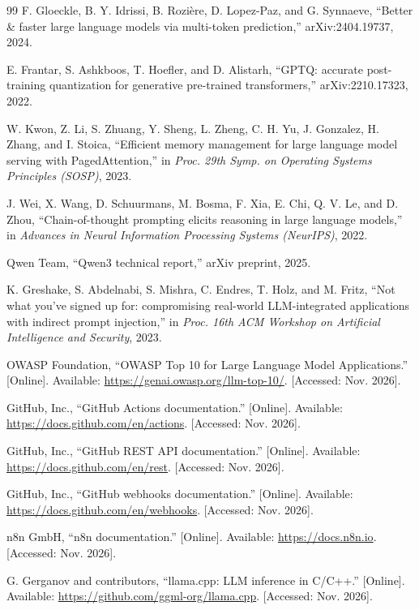 \begin{thebibliography}{99}
F. Gloeckle, B. Y. Idrissi, B. Rozi\`ere, D. Lopez-Paz, and G. Synnaeve, ``Better \& faster large language models via multi-token prediction,'' arXiv:2404.19737, 2024.

E. Frantar, S. Ashkboos, T. Hoefler, and D. Alistarh, ``GPTQ: accurate post-training quantization for generative pre-trained transformers,'' arXiv:2210.17323, 2022.

W. Kwon, Z. Li, S. Zhuang, Y. Sheng, L. Zheng, C. H. Yu, J. Gonzalez, H. Zhang, and I. Stoica, ``Efficient memory management for large language model serving with PagedAttention,'' in \textit{Proc. 29th Symp. on Operating Systems Principles (SOSP)}, 2023.

J. Wei, X. Wang, D. Schuurmans, M. Bosma, F. Xia, E. Chi, Q. V. Le, and D. Zhou, ``Chain-of-thought prompting elicits reasoning in large language models,'' in \textit{Advances in Neural Information Processing Systems (NeurIPS)}, 2022.

Qwen Team, ``Qwen3 technical report,'' arXiv preprint, 2025.

K. Greshake, S. Abdelnabi, S. Mishra, C. Endres, T. Holz, and M. Fritz, ``Not what you've signed up for: compromising real-world LLM-integrated applications with indirect prompt injection,'' in \textit{Proc. 16th ACM Workshop on Artificial Intelligence and Security}, 2023.

OWASP Foundation, ``OWASP Top 10 for Large Language Model Applications.'' [Online]. Available: \url{https://genai.owasp.org/llm-top-10/}. [Accessed: Nov. 2026].

GitHub, Inc., ``GitHub Actions documentation.'' [Online]. Available: \url{https://docs.github.com/en/actions}. [Accessed: Nov. 2026].

GitHub, Inc., ``GitHub REST API documentation.'' [Online]. Available: \url{https://docs.github.com/en/rest}. [Accessed: Nov. 2026].

GitHub, Inc., ``GitHub webhooks documentation.'' [Online]. Available: \url{https://docs.github.com/en/webhooks}. [Accessed: Nov. 2026].

n8n GmbH, ``n8n documentation.'' [Online]. Available: \url{https://docs.n8n.io}. [Accessed: Nov. 2026].

G. Gerganov and contributors, ``llama.cpp: LLM inference in C/C++.'' [Online]. Available: \url{https://github.com/ggml-org/llama.cpp}. [Accessed: Nov. 2026].


\end{thebibliography}
